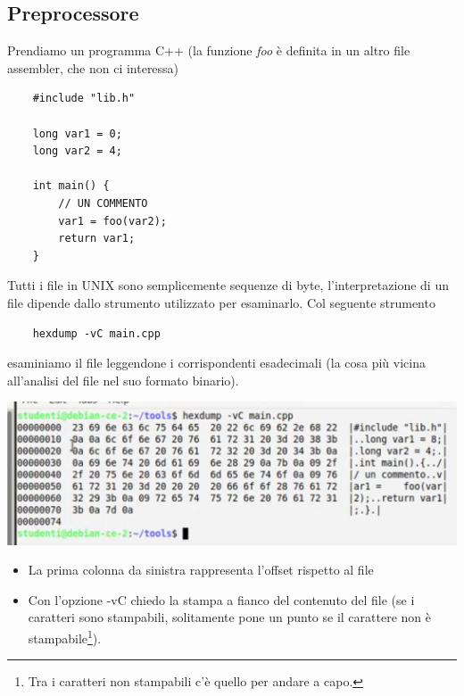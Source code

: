 \subsection{Preprocessore}
Prendiamo un programma C++ (la funzione \emph{foo} è definita in un altro file assembler, che non ci interessa)
\begin{verbatim}
	#include "lib.h"
	
	long var1 = 0;
	long var2 = 4;
	
	int main() {
		// UN COMMENTO
		var1 = foo(var2);
		return var1;
	}
\end{verbatim}
Tutti i file in UNIX sono semplicemente sequenze di byte, l'interpretazione di un file dipende dallo strumento utilizzato per esaminarlo. Col seguente strumento
\begin{verbatim}
	hexdump -vC main.cpp
\end{verbatim}
esaminiamo il file leggendone i corrispondenti esadecimali (la cosa più vicina all'analisi del file nel suo formato binario).\begin{center}
	\includegraphics{img/51.PNG}
\end{center}  
\begin{itemize}
	\item La prima colonna da sinistra rappresenta l'offset rispetto al file
	\item Con l'opzione -vC chiedo la stampa a fianco del contenuto del file (se i caratteri sono stampabili, solitamente pone un punto se il carattere non è stampabile\footnote{Tra i caratteri non stampabili c'è quello per andare a capo.}).
\end{itemize}
